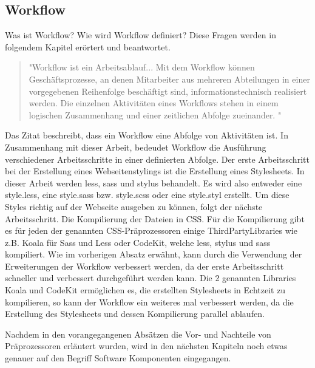 \subsection{Workflow}
Was ist Workflow? Wie wird Workflow definiert?\newline
Diese Fragen werden in folgendem Kapitel erörtert und beantwortet.\newline
\begin{quote}
"Workflow ist ein Arbeitsablauf... Mit dem Workflow können Geschäftsprozesse, an denen Mitarbeiter aus mehreren Abteilungen in einer vorgegebenen Reihenfolge beschäftigt sind, informationstechnisch realisiert werden. Die einzelnen Aktivitäten eines Workflows stehen in einem logischen Zusammenhang und einer zeitlichen Abfolge zueinander. "
\autocite[]{ITWissen.info.2014}
\end{quote}
Das Zitat beschreibt, dass ein Workflow eine Abfolge von Aktivitäten ist. In Zusammenhang mit dieser Arbeit, bedeudet Workflow die Ausführung verschiedener Arbeitsschritte in einer definierten Abfolge.\newline
Der erste Arbeitsschritt bei der Erstellung eines Webseitenstylings ist die Erstellung eines Stylesheets. In dieser Arbeit werden less, sass und stylus behandelt. Es wird also entweder eine style.less, eine style.sass bzw. style.scss oder eine style.styl erstellt. \newline
Um diese Styles richtig auf der Webseite ausgeben zu können, folgt der nächste Arbeitsschritt. Die Kompilierung der Dateien in CSS.\newline
Für die Kompilierung gibt es für jeden der genannten CSS-Präprozessoren einige ThirdPartyLibraries wie z.B. Koala für Sass und Less oder CodeKit, welche less, stylus und sass kompiliert. \newline
Wie im vorherigen Absatz erwähnt, kann durch die Verwendung der Erweiterungen der Workflow verbessert werden, da der erste Arbeitsschritt schneller und verbessert durchgeführt werden kann. \newline
Die 2 genannten Libraries Koala und CodeKit ermöglichen es, die erstellten Stylesheets in Echtzeit zu kompilieren, so kann der Workflow ein weiteres mal verbessert werden, da die Erstellung des Stylesheets und dessen Kompilierung parallel ablaufen.

Nachdem in den vorangegangenen Absätzen die Vor- und Nachteile von Präprozessoren erläutert wurden, wird in den nächsten Kapiteln noch etwas genauer auf den Begriff\newline  \glqq{} Software Komponenten \grqq{} eingegangen.
\newpage
